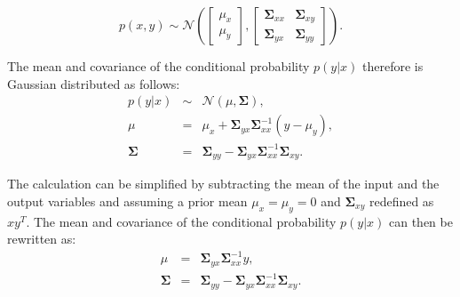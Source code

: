 \documentclass[useAMS,usenatbib,fleqn]{mn2e}
\begin{document}
\begin{equation}
p\left ( x,y\right) \sim \mathcal{N} \left ( \begin{bmatrix}\mu_{x}\\\mu_{y} \end{bmatrix}, \begin{bmatrix}\mathbf\Sigma_{xx} & \mathbf\Sigma_{xy}\\\mathbf\Sigma_{yx} & \mathbf\Sigma_{yy} \end{bmatrix}\right ).
\end{equation}

The mean and covariance of the conditional probability $p(y|x)$ therefore is Gaussian distributed as follows:
\begin{equation}
\begin{array}{rcl}
p(y|x)		&	\sim		&	\mathcal{N} \left ( \mu, \mathbf\Sigma \right ),\\
\mu			&	=		&	\mu_{x}+\mathbf\Sigma_{yx}\mathbf\Sigma_{xx}^{-1}\left ( y-\mu_{y}\right ),\\
\mathbf\Sigma		&	=		&	\mathbf\Sigma_{yy}-\mathbf\Sigma_{yx}\mathbf\Sigma_{xx}^{-1}\mathbf\Sigma_{xy}.
\end{array}
\end{equation}

The calculation can be simplified by subtracting the mean of the input and the output variables and assuming a prior mean $\mu_{x}=\mu_{y}=0$ and $\mathbf\Sigma_{xy}$ redefined as $xy^{T}$. The mean and covariance of the conditional probability $p(y|x)$ can then be rewritten as:
\begin{equation}
\label{eq-conditional-zero-mean}
\begin{array}{rcl}
\mu 		&=&		\mathbf\Sigma_{yx}\mathbf\Sigma_{xx}^{-1}y,\\
\mathbf\Sigma 	&=& 	\mathbf\Sigma_{yy}-\mathbf\Sigma_{yx}\mathbf\Sigma_{xx}^{-1}\mathbf\Sigma_{xy}.
\end{array}
\end{equation}
\end{document}
